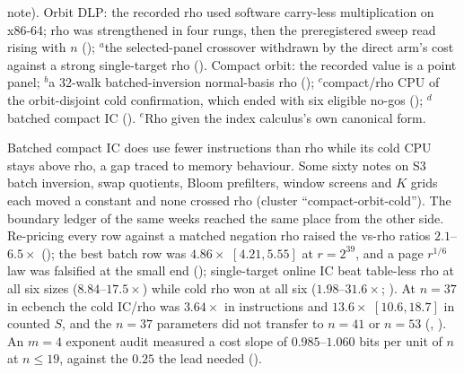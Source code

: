 \begin{table}[t]
{note). Orbit DLP: the recorded rho used software carry-less multiplication
on x86-64; rho was strengthened in four rungs, then the preregistered sweep
read rising with $n$
();
$^{a}$the selected-panel crossover withdrawn by the direct arm's cost
against a strong single-target rho
().
Compact orbit: the recorded value is a point panel;
$^{b}$a 32-walk batched-inversion normal-basis rho
();
$^{c}$compact/rho CPU of the orbit-disjoint cold confirmation, which ended
with six eligible no-gos
();
$^{d}$batched compact IC
().
$^{e}$Rho given the index calculus's own canonical form.}
\label{tab:prog_koblitz-reversals}
\end{table}

Batched compact IC does use fewer instructions than rho while its cold CPU
stays above rho, a gap traced to memory behaviour. Some sixty notes on S3
batch inversion, swap quotients, Bloom prefilters, window screens and $K$
grids each moved a constant and none crossed rho (cluster
``compact-orbit-cold'').
The boundary ledger of the same weeks reached the same place from the other
side. Re-pricing every row against a matched negation rho raised the vs-rho
ratios $2.1$--$6.5\times$ (); the
best batch row was $4.86\times$ $[4.21,5.55]$ at $r=2^{39}$, and a page
$r^{1/6}$ law was falsified at the small end
(); single-target online IC beat
table-less rho at all six sizes ($8.84$--$17.5\times$) while cold rho won at
all six ($1.98$--$31.6\times$; ).
At $n=37$ in ecbench the cold IC/rho was $3.64\times$ in instructions and
$13.6\times$ $[10.6,18.7]$ in counted $S$, and the $n=37$ parameters did not
transfer to $n=41$ or $n=53$
(,
). An $m=4$ exponent
audit measured a cost slope of $0.985$--$1.060$ bits per unit of $n$ at
$n\le19$, against the $0.25$ the lead needed
().

